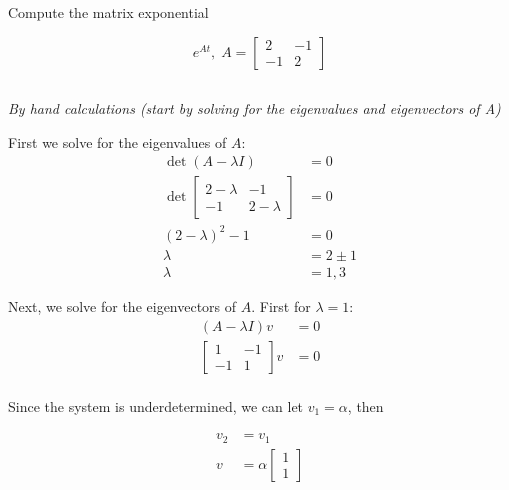 \section{}
Compute the matrix exponential

\[
    e^{At}, \; A = 
    \begin{bmatrix}
        2 & -1 \\ 
        -1 & 2
    \end{bmatrix}
\]

\subsection{}
\textit{By hand calculations (start by solving for the eigenvalues and eigenvectors of A)}

First we solve for the eigenvalues of $A$:
\[
    \begin{aligned}
        \det(A - \lambda I) &= 0 \\
        \det
        \begin{bmatrix}
            2 - \lambda & -1 \\
            -1 & 2 - \lambda
        \end{bmatrix} &= 0 \\
        (2 - \lambda)^2 - 1 &= 0 \\
        \lambda & = 2 \pm 1 \\
        \lambda & = 1, 3
    \end{aligned}
\]

Next, we solve for the eigenvectors of $A$. First for $\lambda = 1$:
\[
    \begin{aligned}
        (A - \lambda I) v &= 0 \\
        \begin{bmatrix}
            1 & -1 \\
            -1 & 1
        \end{bmatrix} v &= 0 \\
    \end{aligned}
\]

Since the system is underdetermined, we can let $v_1 = \alpha$, then

\[
    \begin{aligned}
        v_2 &= v_1 \\
        v &= \alpha
        \begin{bmatrix}
            1 \\
            1
        \end{bmatrix}
    \end{aligned}
\]

